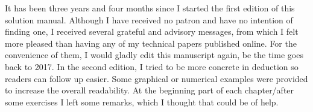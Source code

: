 \documentclass[UTF8]{ctexart}
\begin{document}

It has been three years and four months since I started the first edition of this solution manual. 
Although I have received no patron and have no intention of finding one, I received several grateful and advisory messages, from which I felt more pleased than having any of my technical papers published online. 
For the convenience of them, I would gladly edit this manuscript again, be the time goes back to 2017. 
In the second edition, I tried to be more concrete in deduction so readers can follow up easier. 
Some graphical or numerical examples were provided to increase the overall readability. 
At the beginning part of each chapter/after some exercises I left some remarks, which I thought that could be of help. 
\end{document}

